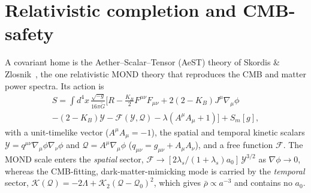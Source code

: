 \documentclass[aps,prd,preprint,nofootinbib,floatfix]{revtex4-2}
\begin{document}
\section{Relativistic completion and CMB-safety}
\label{sec:bridge1}
A covariant home is the Aether--Scalar--Tensor (AeST) theory of Skordis \&
Zlosnik~\cite{Skordis2021}, the one relativistic MOND theory that reproduces the
CMB and matter power spectra. Its action is
\begin{multline}
S=\!\int\! d^4x\,\frac{\sqrt{-g}}{16\pi\tilde G}\Big[R-\tfrac{K_B}{2}F^{\mu\nu}F_{\mu\nu}
+2(2-K_B)J^\mu\nabla_\mu\phi\\
-(2-K_B)\mathcal{Y}-\mathcal{F}(\mathcal{Y},\mathcal{Q})
-\lambda(A^\mu A_\mu+1)\Big]+S_m[g],
\label{eq:aest}
\end{multline}
with a unit-timelike vector ($A^\mu A_\mu=-1$), the spatial and temporal kinetic
scalars $\mathcal{Y}=q^{\mu\nu}\nabla_\mu\phi\nabla_\nu\phi$ and
$\mathcal{Q}=A^\mu\nabla_\mu\phi$ ($q_{\mu\nu}=g_{\mu\nu}+A_\mu A_\nu$), and a free
function $\mathcal{F}$. The MOND scale enters the {\it spatial} sector,
$\mathcal{F}\to[2\lambda_s/(1+\lambda_s)a_0]\,\mathcal{Y}^{3/2}$ as
$\nabla\phi\to0$, whereas the CMB-fitting, dark-matter-mimicking mode is carried
by the {\it temporal} sector,
$\mathcal{K}(\mathcal{Q})=-2\Lambda+\mathcal{K}_2(\mathcal{Q}-\mathcal{Q}_0)^2$,
which gives $\bar\rho\propto a^{-3}$ and contains no $a_0$.
\end{document}
